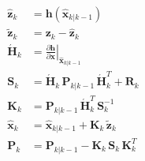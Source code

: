 \begin{equation*}
    \begin{aligned}
        \hat{\mathbf{z}}_{k} &= \mathbf{h} \left( \hat{\mathbf{x}}_{k|k-1} \right) \\
        \tilde{\mathbf{z}}_k &= \mathbf{z}_k - \hat{\mathbf{z}}_k \\
        \mathbf{\acute{H}}_{k} &= \left. \frac{\partial \mathbf{h}}{\partial \mathbf{x}} \right|_{\hat{\mathbf{x}}_{k|k-1}} \\
        \mathbf{S}_{k} &= \mathbf{\acute{H}}_{k} \, \mathbf{P}_{k|k-1} \, \mathbf{\acute{H}}_{k}^T + \mathbf{R}_{k} \\
        \mathbf{K}_{k} &= \mathbf{P}_{k|k-1} \, \mathbf{\acute{H}}_{k}^T \, \mathbf{S}_{k}^{-1} \\
        \hat{\mathbf{x}}_k &= \hat{\mathbf{x}}_{k|k-1} +\mathbf{K}_k \, \tilde{\mathbf{z}}_k \\
        \mathbf{P}_k &= \mathbf{P}_{k|k-1} - \mathbf{K}_{k} \, \mathbf{S}_{k} \, \mathbf{K}_{k}^T
    \end{aligned}
\end{equation*}

